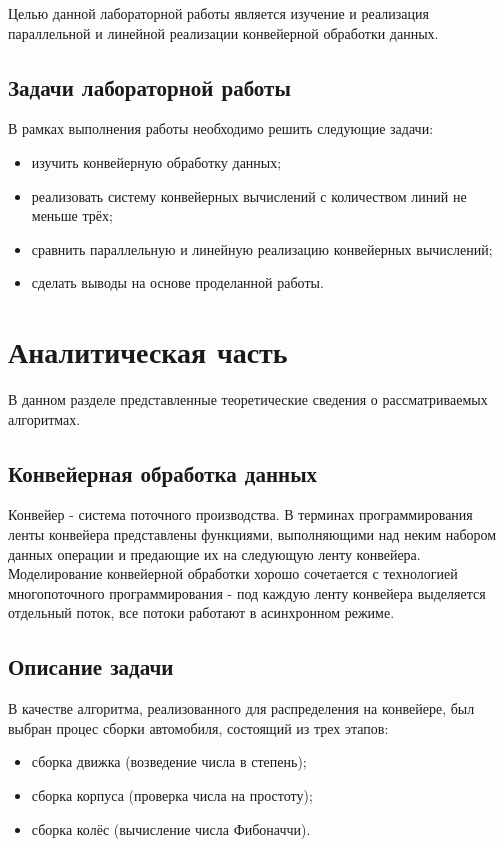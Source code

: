 \documentclass[12pt]{report}
\begin{document}
Целью данной лабораторной работы является изучение и реализация параллельной и линейной реализации конвейерной обработки данных.

\section*{Задачи лабораторной работы}

В рамках выполнения работы необходимо решить следующие задачи:

\begin{itemize}
	\item изучить конвейерную обработку данных;
	\item реализовать систему конвейерных вычислений с количеством линий не меньше трёх;
	\item сравнить параллельную и линейную реализацию конвейерных вычислений;
	\item сделать выводы на основе проделанной работы.
\end{itemize}

\chapter{Аналитическая часть}

В данном разделе представленные теоретические сведения о рассматриваемых алгоритмах.

\section{Конвейерная обработка данных}

Конвейер - система поточного производства. В терминах программирования ленты конвейера представлены функциями, выполняющими над неким набором данных операции и предающие их на следующую ленту конвейера. Моделирование конвейерной обработки хорошо сочетается с технологией многопоточного программирования - под каждую ленту конвейера выделяется отдельный поток, все потоки работают в асинхронном режиме.


\section{Описание задачи}

В качестве алгоритма, реализованного для распределения на конвейере, был выбран процес сборки автомобиля, состоящий из трех этапов:

\begin{itemize}
	\item сборка движка (возведение числа в степень);
	\item сборка корпуса (проверка числа на простоту);
	\item сборка колёс (вычисление числа Фибоначчи).
\end{itemize}
\end{document}
